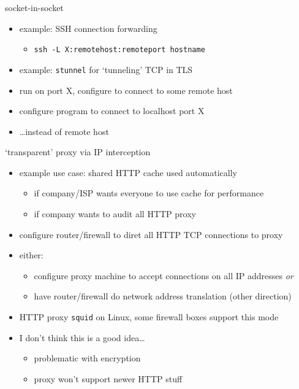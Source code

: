 
\begin{frame}{socket-in-socket}
    \begin{itemize}
    \item example: SSH connection forwarding
        \begin{itemize}
        \item \texttt{ssh -L X:remotehost:remoteport hostname}
        \end{itemize}
    \item example: \texttt{stunnel} for `tunneling' TCP in TLS
    \item run on port X, configure to connect to some remote host
    \item configure program to connect to localhost port X
    \item \ldots instead of remote host
    \end{itemize}
\end{frame}


\begin{frame}[fragile]{`transparent' proxy via IP interception}
    \begin{itemize}
    \item example use case: shared HTTP cache used automatically
        \begin{itemize}
        \item if company/ISP wants everyone to use cache for performance
        \item if company wants to audit all HTTP proxy
        \end{itemize}
    \item configure router/firewall to diret all HTTP TCP connections to proxy
    \item either:
        \begin{itemize}
        \item configure proxy machine to accept connections on all IP addresses \textit{or}
        \item have router/firewall do network address translation (other direction)
        \end{itemize}
    \item HTTP proxy \texttt{squid} on Linux, some firewall boxes support this mode
    \item I don't think this is a good idea\ldots
        \begin{itemize}
        \item problematic with encryption
        \item proxy won't support newer HTTP stuff
        \end{itemize}
    \end{itemize}
\end{frame}

